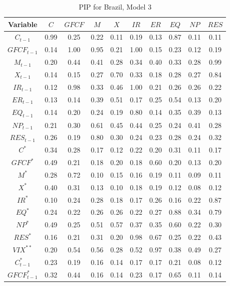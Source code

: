 \documentclass[a4paper, twoside]{templates/ociamthesis}
\begin{document}
\begin{table}[!ht]

\caption{\label{tab:TablePIPBR3}PIP for Brazil, Model 3}
\centering
\fontsize{8}{10}\selectfont
\begin{tabular}[t]{cccccccccc}
\toprule
Variable & $C$ & $GFCF$ & $M$ & $X$ & $IR$ & $ER$ & $EQ$ & $NP$ & $RES$\\
\midrule
$C_{t-1}$ & 0.99 & 0.25 & 0.22 & 0.11 & 0.19 & 0.13 & 0.87 & 0.11 & 0.11\\
$GFCF_{t-1}$ & 0.14 & 1.00 & 0.95 & 0.21 & 1.00 & 0.15 & 0.23 & 0.12 & 0.19\\
$M_{t-1}$ & 0.20 & 0.44 & 0.41 & 0.28 & 0.34 & 0.40 & 0.33 & 0.28 & 0.99\\
$X_{t-1}$ & 0.14 & 0.15 & 0.27 & 0.70 & 0.33 & 0.18 & 0.28 & 0.27 & 0.84\\
$IR_{t-1}$ & 0.12 & 0.98 & 0.33 & 0.46 & 1.00 & 0.21 & 0.26 & 0.26 & 0.22\\
$ER_{t-1}$ & 0.13 & 0.14 & 0.39 & 0.51 & 0.17 & 0.25 & 0.54 & 0.13 & 0.20\\
$EQ_{t-1}$ & 0.14 & 0.20 & 0.24 & 0.19 & 0.80 & 0.14 & 0.35 & 0.39 & 0.13\\
$NP_{t-1}$ & 0.21 & 0.30 & 0.61 & 0.45 & 0.44 & 0.25 & 0.24 & 0.41 & 0.28\\
$RES_{t-1}$ & 0.26 & 0.19 & 0.80 & 0.30 & 0.24 & 0.23 & 0.28 & 0.24 & 0.32\\
$C^*$ & 0.34 & 0.28 & 0.17 & 0.12 & 0.22 & 0.20 & 0.31 & 0.11 & 0.17\\
$GFCF^*$ & 0.49 & 0.21 & 0.18 & 0.20 & 0.18 & 0.60 & 0.20 & 0.13 & 0.20\\
$M^*$ & 0.28 & 0.72 & 0.10 & 0.15 & 0.16 & 0.19 & 0.11 & 0.09 & 0.11\\
$X^*$ & 0.40 & 0.31 & 0.13 & 0.10 & 0.18 & 0.19 & 0.12 & 0.08 & 0.12\\
$IR^*$ & 0.10 & 0.24 & 0.28 & 0.18 & 0.17 & 0.26 & 0.16 & 0.22 & 0.87\\
$EQ^*$ & 0.24 & 0.22 & 0.26 & 0.26 & 0.22 & 0.27 & 0.88 & 0.34 & 0.79\\
$NP^*$ & 0.49 & 0.25 & 0.51 & 0.57 & 0.37 & 0.35 & 0.60 & 0.22 & 0.30\\
$RES^*$ & 0.16 & 0.21 & 0.31 & 0.20 & 0.98 & 0.67 & 0.25 & 0.22 & 0.43\\
$VIX^{**}$ & 0.20 & 0.54 & 0.56 & 0.28 & 0.52 & 0.97 & 0.38 & 0.49 & 0.27\\
$C^*_{t-1}$ & 0.23 & 0.19 & 0.16 & 0.14 & 0.17 & 0.17 & 0.21 & 0.08 & 0.12\\
$GFCF^*_{t-1}$ & 0.32 & 0.44 & 0.16 & 0.14 & 0.23 & 0.17 & 0.65 & 0.11 & 0.14\\

\end{tabular}
\end{table}
\end{document}
